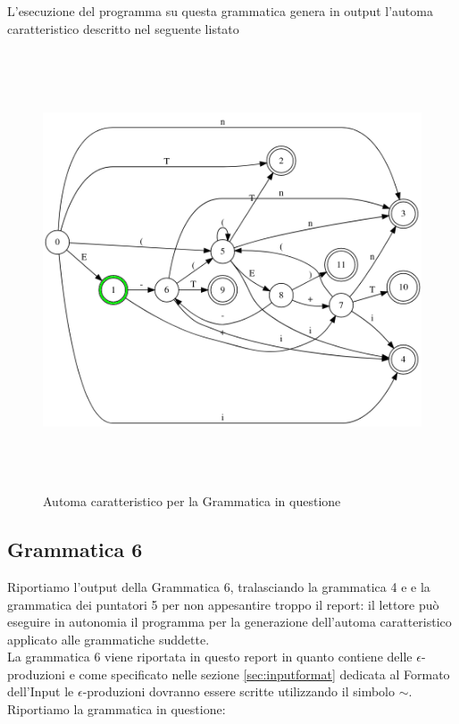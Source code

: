 \documentclass[12pt]{article}
\begin{document}
L'esecuzione del programma su questa grammatica genera in output l'automa caratteristico descritto nel seguente listato

\begin{figure}[h]
  \includegraphics[height=13cm, keepaspectratio]{assets/automa3.png}
  \caption{Automa caratteristico per la Grammatica in questione}
  \label{fig:automa1}
\end{figure}

\subsection{Grammatica 6}
Riportiamo l'output della Grammatica 6, tralasciando la grammatica 4 e e la grammatica dei puntatori 5 per non appesantire troppo il report: il lettore può eseguire in autonomia il programma per la generazione dell'automa caratteristico applicato alle grammatiche suddette.\\

La grammatica 6 viene riportata in questo report in quanto contiene delle $\epsilon$-produzioni e come specificato nelle sezione \ref{sec:inputformat} dedicata al Formato dell'Input le $\epsilon$-produzioni dovranno essere scritte utilizzando il simbolo 
$\sim$. \\

Riportiamo la grammatica in questione:

\end{document}
